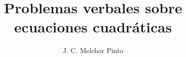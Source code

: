 \documentclass[12pt]{guia}
\title{Problemas verbales sobre ecuaciones cuadráticas}
\author{J. C. Melchor Pinto}
\begin{document}
\pagestyle{plain}
\addpoints
\INFO
\printanswers
\begin{questions}
    
\end{questions}

\vfill
\puntuacion
\end{document}
